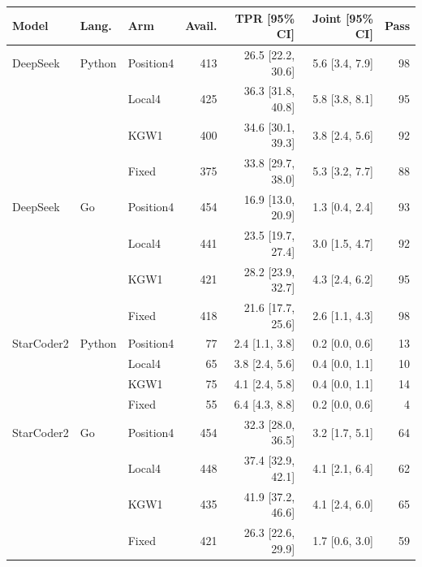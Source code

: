 \begin{tabular}{lllrrrr}
\toprule
Model & Lang. & Arm & Avail. & TPR [95\% CI] & Joint [95\% CI] & Pass \\
\midrule
DeepSeek & Python & Position4 & 413 & 26.5 [22.2, 30.6] & 5.6 [3.4, 7.9] & 98 \\
 &  & Local4 & 425 & 36.3 [31.8, 40.8] & 5.8 [3.8, 8.1] & 95 \\
 &  & KGW1 & 400 & 34.6 [30.1, 39.3] & 3.8 [2.4, 5.6] & 92 \\
 &  & Fixed & 375 & 33.8 [29.7, 38.0] & 5.3 [3.2, 7.7] & 88 \\
DeepSeek & Go & Position4 & 454 & 16.9 [13.0, 20.9] & 1.3 [0.4, 2.4] & 93 \\
 &  & Local4 & 441 & 23.5 [19.7, 27.4] & 3.0 [1.5, 4.7] & 92 \\
 &  & KGW1 & 421 & 28.2 [23.9, 32.7] & 4.3 [2.4, 6.2] & 95 \\
 &  & Fixed & 418 & 21.6 [17.7, 25.6] & 2.6 [1.1, 4.3] & 98 \\
StarCoder2 & Python & Position4 & 77 & 2.4 [1.1, 3.8] & 0.2 [0.0, 0.6] & 13 \\
 &  & Local4 & 65 & 3.8 [2.4, 5.6] & 0.4 [0.0, 1.1] & 10 \\
 &  & KGW1 & 75 & 4.1 [2.4, 5.8] & 0.4 [0.0, 1.1] & 14 \\
 &  & Fixed & 55 & 6.4 [4.3, 8.8] & 0.2 [0.0, 0.6] & 4 \\
StarCoder2 & Go & Position4 & 454 & 32.3 [28.0, 36.5] & 3.2 [1.7, 5.1] & 64 \\
 &  & Local4 & 448 & 37.4 [32.9, 42.1] & 4.1 [2.1, 6.4] & 62 \\
 &  & KGW1 & 435 & 41.9 [37.2, 46.6] & 4.1 [2.4, 6.0] & 65 \\
 &  & Fixed & 421 & 26.3 [22.6, 29.9] & 1.7 [0.6, 3.0] & 59 \\
\bottomrule
\end{tabular}
